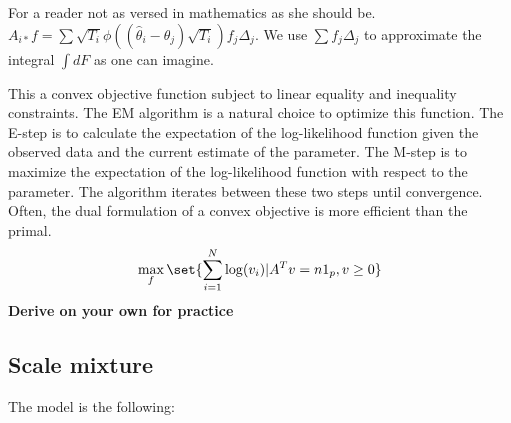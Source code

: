 \begin{remark}
    For a reader not as versed in mathematics as she should be. $A_{i*}f = \sum \sqrt{T_i}\phi((\hat{\theta}_i-\theta_j)\sqrt{T_i})f_j\Delta_j$.
    We use $\sum f_j\Delta_j$ to approximate the integral $\int dF$ as one can imagine.
\end{remark}
This a convex objective function subject to linear equality  and inequality constraints. The EM algorithm is a natural choice to optimize this function. The E-step is to calculate the expectation of the log-likelihood function given the observed data and the current estimate of the parameter. The M-step is to maximize the expectation of the log-likelihood function with respect to the parameter. The algorithm iterates between these two steps until convergence.
Often, the dual formulation of a convex objective is more efficient than the primal.
\begin{equation*}
    \max_f \set{ \sum_{i=1}^N\log (v_i)|A^T v = n 1_p, v\ge 0}
\end{equation*}
\textbf{Derive on your own for practice}

\subsection{Scale mixture}
The model is the following:
\begin{equation*}

\end{equation*}


